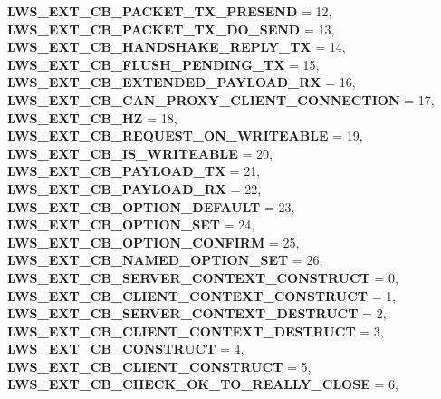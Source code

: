 \begin{DoxyCompactItemize}
{\bfseries L\+W\+S\+\_\+\+E\+X\+T\+\_\+\+C\+B\+\_\+\+P\+A\+C\+K\+E\+T\+\_\+\+T\+X\+\_\+\+P\+R\+E\+S\+E\+ND} = 12, 
{\bfseries L\+W\+S\+\_\+\+E\+X\+T\+\_\+\+C\+B\+\_\+\+P\+A\+C\+K\+E\+T\+\_\+\+T\+X\+\_\+\+D\+O\+\_\+\+S\+E\+ND} = 13, 
\newline
{\bfseries L\+W\+S\+\_\+\+E\+X\+T\+\_\+\+C\+B\+\_\+\+H\+A\+N\+D\+S\+H\+A\+K\+E\+\_\+\+R\+E\+P\+L\+Y\+\_\+\+TX} = 14, 
{\bfseries L\+W\+S\+\_\+\+E\+X\+T\+\_\+\+C\+B\+\_\+\+F\+L\+U\+S\+H\+\_\+\+P\+E\+N\+D\+I\+N\+G\+\_\+\+TX} = 15, 
{\bfseries L\+W\+S\+\_\+\+E\+X\+T\+\_\+\+C\+B\+\_\+\+E\+X\+T\+E\+N\+D\+E\+D\+\_\+\+P\+A\+Y\+L\+O\+A\+D\+\_\+\+RX} = 16, 
{\bfseries L\+W\+S\+\_\+\+E\+X\+T\+\_\+\+C\+B\+\_\+\+C\+A\+N\+\_\+\+P\+R\+O\+X\+Y\+\_\+\+C\+L\+I\+E\+N\+T\+\_\+\+C\+O\+N\+N\+E\+C\+T\+I\+ON} = 17, 
\newline
{\bfseries L\+W\+S\+\_\+\+E\+X\+T\+\_\+\+C\+B\+\_\+HZ} = 18, 
{\bfseries L\+W\+S\+\_\+\+E\+X\+T\+\_\+\+C\+B\+\_\+\+R\+E\+Q\+U\+E\+S\+T\+\_\+\+O\+N\+\_\+\+W\+R\+I\+T\+E\+A\+B\+LE} = 19, 
{\bfseries L\+W\+S\+\_\+\+E\+X\+T\+\_\+\+C\+B\+\_\+\+I\+S\+\_\+\+W\+R\+I\+T\+E\+A\+B\+LE} = 20, 
{\bfseries L\+W\+S\+\_\+\+E\+X\+T\+\_\+\+C\+B\+\_\+\+P\+A\+Y\+L\+O\+A\+D\+\_\+\+TX} = 21, 
\newline
{\bfseries L\+W\+S\+\_\+\+E\+X\+T\+\_\+\+C\+B\+\_\+\+P\+A\+Y\+L\+O\+A\+D\+\_\+\+RX} = 22, 
{\bfseries L\+W\+S\+\_\+\+E\+X\+T\+\_\+\+C\+B\+\_\+\+O\+P\+T\+I\+O\+N\+\_\+\+D\+E\+F\+A\+U\+LT} = 23, 
{\bfseries L\+W\+S\+\_\+\+E\+X\+T\+\_\+\+C\+B\+\_\+\+O\+P\+T\+I\+O\+N\+\_\+\+S\+ET} = 24, 
{\bfseries L\+W\+S\+\_\+\+E\+X\+T\+\_\+\+C\+B\+\_\+\+O\+P\+T\+I\+O\+N\+\_\+\+C\+O\+N\+F\+I\+RM} = 25, 
\newline
{\bfseries L\+W\+S\+\_\+\+E\+X\+T\+\_\+\+C\+B\+\_\+\+N\+A\+M\+E\+D\+\_\+\+O\+P\+T\+I\+O\+N\+\_\+\+S\+ET} = 26, 
{\bfseries L\+W\+S\+\_\+\+E\+X\+T\+\_\+\+C\+B\+\_\+\+S\+E\+R\+V\+E\+R\+\_\+\+C\+O\+N\+T\+E\+X\+T\+\_\+\+C\+O\+N\+S\+T\+R\+U\+CT} = 0, 
{\bfseries L\+W\+S\+\_\+\+E\+X\+T\+\_\+\+C\+B\+\_\+\+C\+L\+I\+E\+N\+T\+\_\+\+C\+O\+N\+T\+E\+X\+T\+\_\+\+C\+O\+N\+S\+T\+R\+U\+CT} = 1, 
{\bfseries L\+W\+S\+\_\+\+E\+X\+T\+\_\+\+C\+B\+\_\+\+S\+E\+R\+V\+E\+R\+\_\+\+C\+O\+N\+T\+E\+X\+T\+\_\+\+D\+E\+S\+T\+R\+U\+CT} = 2, 
\newline
{\bfseries L\+W\+S\+\_\+\+E\+X\+T\+\_\+\+C\+B\+\_\+\+C\+L\+I\+E\+N\+T\+\_\+\+C\+O\+N\+T\+E\+X\+T\+\_\+\+D\+E\+S\+T\+R\+U\+CT} = 3, 
{\bfseries L\+W\+S\+\_\+\+E\+X\+T\+\_\+\+C\+B\+\_\+\+C\+O\+N\+S\+T\+R\+U\+CT} = 4, 
{\bfseries L\+W\+S\+\_\+\+E\+X\+T\+\_\+\+C\+B\+\_\+\+C\+L\+I\+E\+N\+T\+\_\+\+C\+O\+N\+S\+T\+R\+U\+CT} = 5, 
{\bfseries L\+W\+S\+\_\+\+E\+X\+T\+\_\+\+C\+B\+\_\+\+C\+H\+E\+C\+K\+\_\+\+O\+K\+\_\+\+T\+O\+\_\+\+R\+E\+A\+L\+L\+Y\+\_\+\+C\+L\+O\+SE} = 6, 

\end{DoxyCompactItemize}
